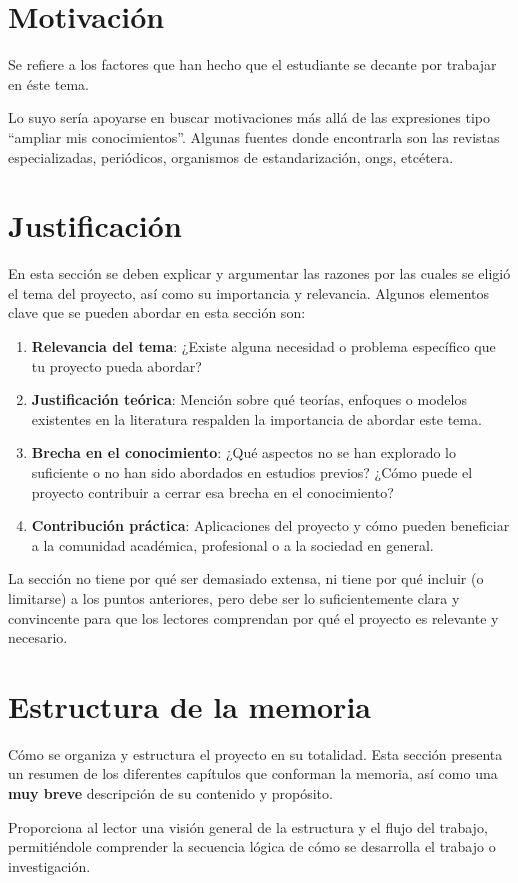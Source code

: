 
\section{Motivación}

Se refiere a los factores que han hecho que el estudiante se decante por trabajar en éste tema.

Lo suyo sería apoyarse en buscar motivaciones más allá de las expresiones tipo \enquote{ampliar mis conocimientos}. Algunas fuentes donde encontrarla son las revistas especializadas, periódicos, organismos de estandarización, \glspl{ong}, etcétera.

\section{Justificación}

En esta sección se deben explicar y argumentar las razones por las cuales se eligió el tema del proyecto, así como su importancia y relevancia. Algunos elementos clave que se pueden abordar en esta sección son:

\begin{enumerate}
    \item \textbf{Relevancia del tema}: ¿Existe alguna necesidad o problema específico que tu proyecto pueda abordar?
    \item \textbf{Justificación teórica}: Mención sobre qué teorías, enfoques o modelos existentes en la literatura respalden la importancia de abordar este tema.
    \item \textbf{Brecha en el conocimiento}: ¿Qué aspectos no se han explorado lo suficiente o no han sido abordados en estudios previos? ¿Cómo puede el proyecto contribuir a cerrar esa brecha en el conocimiento?
    \item \textbf{Contribución práctica}: Aplicaciones del proyecto y cómo pueden beneficiar a la comunidad académica, profesional o a la sociedad en general.
\end{enumerate}

La sección no tiene por qué ser demasiado extensa, ni tiene por qué incluir (o limitarse) a los puntos anteriores, pero debe ser lo suficientemente clara y convincente para que los lectores comprendan por qué el proyecto es relevante y necesario.

\section{Estructura de la memoria}

Cómo se organiza y estructura el proyecto en su totalidad. Esta sección presenta un resumen de los diferentes capítulos que conforman la memoria, así como una \textbf{muy breve} descripción de su contenido y propósito.

Proporciona al lector una visión general de la estructura y el flujo del trabajo, permitiéndole comprender la secuencia lógica de cómo se desarrolla el trabajo o investigación.